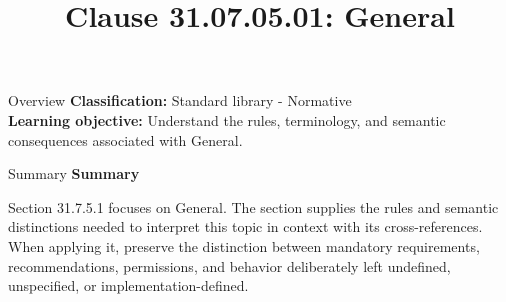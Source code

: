 \documentclass[10pt,letterpaper]{article}
\title{Clause 31.07.05.01: General}
\author{}
\date{}
\begin{document}
\maketitle
\begin{CornellOverviewBox}{Overview}
\textbf{Classification:} Standard library - Normative\\[2pt]
\textbf{Learning objective:} Understand the rules, terminology, and semantic consequences associated with General.
\end{CornellOverviewBox}\begin{CornellSummaryBox}{Summary}
{\sffamily\bfseries\color{Accent} Summary}\par\vspace{3pt}Section 31.7.5.1 focuses on General. The section supplies the rules and semantic distinctions needed to interpret this topic in context with its cross-references. When applying it, preserve the distinction between mandatory requirements, recommendations, permissions, and behavior deliberately left undefined, unspecified, or implementation-defined.
\end{CornellSummaryBox}
\end{document}
